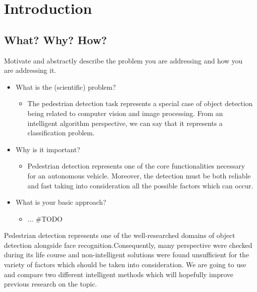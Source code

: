 \documentclass[runningheads,a4paper,11pt]{report}
\begin{document}
\tableofcontents

\newpage

\listoftables
\listoffigures
\listofalgorithms

\newpage




\newpage



 


\chapter{Introduction}
\label{chapter:introduction}

\section{What? Why? How?}
\label{section:what}

Motivate and abstractly describe the problem you are addressing and how you are addressing it. 
\begin{itemize}
	\item What is the (scientific) problem? 
	\begin{itemize}
		\item The pedestrian detection task represents a special case of object detection being related to computer vision and image processing. From an intelligent algorithm perspective, we can say that it represents a classification problem.
	\end{itemize}
	\item Why is it important? 
	\begin{itemize}
		\item Pedestrian detection represents one of the core functionalities necessary for an autonomous vehicle. Moreover, the detection must be both reliable and fast taking into consideration all the possible factors which can occur.
	\end{itemize}
	\item What is your basic approach? 
	\begin{itemize}
		\item $\ldots$ \#TODO
	\end{itemize}
\end{itemize}

Pedestrian detection represents one of the well-researched domains of object detection alongside face recognition.Consequently, many perspective were checked during its life course and non-intelligent solutions were found unsufficient for the variety of factors which should be taken into consideration. We are going to use and compare two different intelligent methods which will hopefully improve previous research on the topic.
\end{document}

